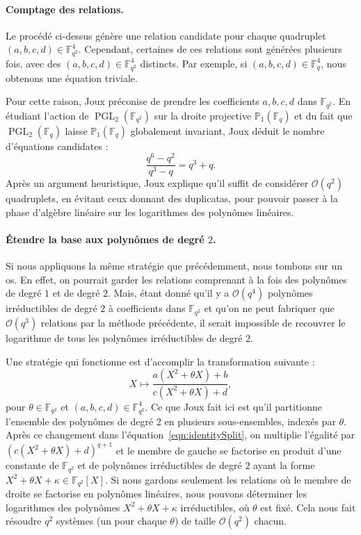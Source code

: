 \documentclass[a4paper, titlepage, 11pt]{article}
\theoremstyle{definition}
\theoremstyle{remark}
\def\O{\mathcal O}
\def\gf #1{\mathbb{F}_{#1}}
\begin{document}
\paragraph{Comptage des relations.}Le procédé ci-dessus génère une relation candidate pour chaque quadruplet $(a,b,c,d) \in \gf{q^2}^4$. Cependant, certaines de ces relations sont générées plusieurs fois, avec des $(a,b,c,d)\in\gf{q^2}^4$ distincts. Par exemple, si $(a,b,c,d)\in\gf{q}^4$, nous obtenons une équation triviale.

Pour cette raison, Joux \cite{joux2013} préconise de prendre les coefficients $a,b,c,d$ dans $\gf{q^2}$. En étudiant l'action de $\operatorname{PGL}_2(\gf{q^2})$ sur la droite projective $\mathbb{P}_1(\gf{q})$ et du fait que $\operatorname{PGL}_2(\gf{q})$ laisse $\mathbb{P}_1(\gf{q})$ globalement invariant, Joux déduit le nombre d'équations candidates : 
$$\frac{q^6 - q^2}{q^3 - q} = q^3 + q.$$
Après un argument heuristique, Joux \cite{joux2013} explique qu'il suffit de considérer $\O(q^2)$ quadruplets, en évitant ceux donnant des duplicatas, pour pouvoir passer à la phase d'algèbre linéaire sur les logarithmes des polynômes linéaires.

\paragraph{Étendre la base aux polynômes de degré $2$.} Si nous appliquons la même stratégie que précédemment, nous tombons sur un os. En effet, on pourrait garder les relations comprenant à la fois des polynômes de degré $1$ et de degré $2$. Mais, étant donné qu'il y a $\O(q^4)$ polynômes irréductibles de degré $2$ à coefficients dans $\gf{q^2}$ et qu'on ne peut fabriquer que $\O(q^3)$ relations par la méthode précédente, il serait impossible de recouvrer le logarithme de tous les polynômes irréductibles de degré $2$.

Une stratégie qui fonctionne est d'accomplir la transformation suivante :
$$X \mapsto \frac{a(X^2+\theta X) + b}{c(X^2 + \theta X) +d},$$
pour $\theta \in \gf{q^2}$ et $(a,b,c,d) \in \gf{q^2}^4$. Ce que Joux \cite{joux2013} fait ici est qu'il partitionne l'ensemble des polynômes de degré $2$ en plusieurs sous-ensembles, indexés par $\theta$. Après ce changement dans l'équation~\ref{eqn:identitySplit}, on multiplie l'égalité par $\left(c(X^2+\theta X) +d\right)^{q+1}$ et le membre de gauche se factorise en  produit d'une constante de $\gf{q^2}$ et de polynômes irréductibles de degré $2$ ayant la forme $X^2 + \theta X + \kappa \in \gf{q^2}[X]$. Si nous gardons seulement les relations où le membre de droite se factorise en polynômes linéaires, nous pouvons déterminer les logarithmes des polynômes $X^2 +\theta X + \kappa$ irréductibles, où $\theta$ est fixé. Cela nous fait résoudre $q^2$ systèmes (un pour chaque $\theta$) de taille $\O(q^2)$ chacun.
\end{document}
